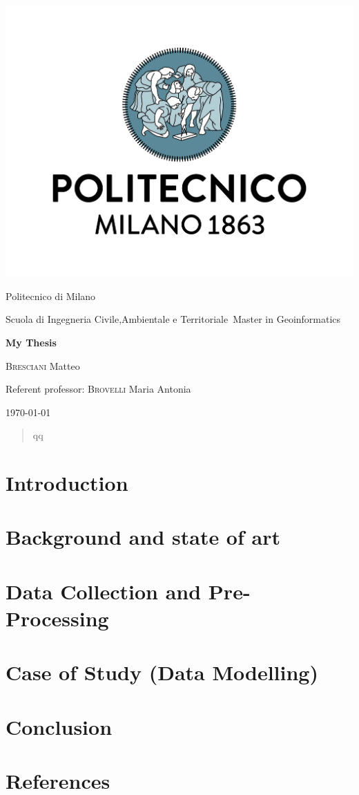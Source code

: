 \documentclass[fontsize=11pt,paper=a4,pagesize=auto]{report}
\begin{document}
\begin{titlepage}
	\centering
	\includegraphics[scale = 0.20]{images/polimi.jpg}\par
	{\Large
		Politecnico di Milano\par
		Scuola di Ingegneria Civile,Ambientale e Territoriale\
		Master in Geoinformatics\par}
			\vspace{0.5cm}
	{\huge\bfseries
		My Thesis\\\par}
	\vspace{1cm}
	{\Large
		{\scshape Bresciani} Matteo\par}
	\vfill
	Referent professor: {\scshape Brovelli} Maria Antonia\par
	\vfill
	{\large\today\par}
\end{titlepage}


\tableofcontents


\begin{abstract}
qq
\end{abstract}

\chapter{Introduction}
 

\chapter{Background and state of art}


\chapter{Data Collection and Pre-Processing}


\chapter{Case of Study (Data Modelling) }


\chapter{Conclusion}


\chapter{References}

\end{document}
